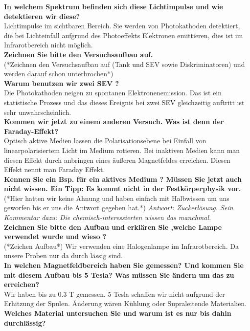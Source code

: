 \textbf{In welchem Spektrum befinden sich diese Lichtimpulse und wie detektieren wir diese?} \\
Lichtimpulse im sichtbaren Bereich. Sie werden von Photokathoden detektiert, die bei Lichteinfall 
aufgrund des Photoeffekts Elektronen emittieren, dies ist im Infrarotbereich nicht möglich. \\
\textbf{Zeichnen Sie bitte den Versuchsaufbau auf.} \\
(*Zeichnen den Versuchsaufbau auf (Tank und SEV sowie Diskriminatoren) und werden darauf schon 
unterbrochen*) \\
\textbf{Warum benutzen wir zwei SEV ? }\\
Die Photokathoden neigen zu spontanen Elektronenemission. Das ist ein statistische Prozess und 
das dieses Ereignis bei zwei SEV gleichzeitig auftritt ist sehr unwahrscheinlich. \\
\textbf{Kommen wir jetzt zu einem anderen Versuch. Was ist denn der Faraday-Effekt?}\\
Optisch aktive Medien lassen die Polarisationsebene bei Einfall von linearpolarisiertem Licht 
im Medium rotieren. Bei inaktiven Medien kann man diesen Effekt durch anbringen eines äußeren 
Magnetfeldes erreichen. Diesen Effekt nennt man Faraday Effekt. \\
\textbf{Kennen Sie ein Bsp. für ein aktives Medium ? Müssen Sie jetzt auch nicht wissen. Ein Tipp:
 Es kommt nicht in der Festkörperphysik vor.} \\
(*Hier hatten wir keine Ahnung und haben einfach mit Halbwissen um uns geworfen bis er uns die 
Antwort gegeben hat.*) 
\textit{Antwort: Zuckerlösung. Sein Kommentar dazu: Die chemisch-interessierten 
wissen das manchmal.} \\
\textbf{Zeichnen Sie bitte den Aufbau und erklären Sie ,welche Lampe verwendet wurde und wieso ?}\\
(*Zeichen Aufbau*) Wir verwenden eine Halogenlampe im Infrarotbereich. Da unsere Proben nur da 
durch lässig sind. \\
\textbf{In welchen Magnetfeldbereich haben Sie gemessen? Und kommen Sie mit diesem Aufbau bis 5 
Tesla? Was müssen Sie ändern um das zu erreichen?}\\
Wir haben bis zu 0.3 T gemessen. 5 Tesla schaffen wir nicht aufgrund der Erhitzung der Spulen. 
Änderung wären Kühlung oder Supraleitende Materialien. \\
\textbf{Welches Material untersuchen Sie und warum ist es nur bis dahin durchlässig?} \\
